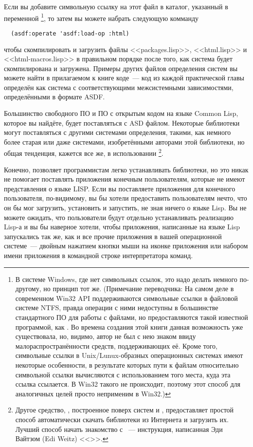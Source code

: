 Если вы добавите символьную ссылку на этот файл в каталог, указанный в переменной
\footnote{В системе Windows, где нет символьных ссылок, это
  надо делать немного по-другому, но принцип тот же. (Примечание переводчика: На самом
  деле в современном Win32 API поддерживаются символьные ссылки в файловой системе NTFS,
  правда операции с ними недоступны в большинстве стандартного ПО для работы с файлами, но
  предоставляются такой известной программой, как . Во времена создания этой
  книги данная возможность уже существовала, но, видимо, автор не был с нею знаком ввиду
  малораспространённости средств, поддерживающих её. Кроме того, символьные ссылки в
  Unix/Lunux-образных операционных системах имеют некоторые особенности, в результате
  которых пути к файлам относительно символьной ссылки вычисляются с использованием того
  места, куда эта ссылка ссылается. В Win32 такого не происходит, поэтому этот способ для
  аналогичных целей просто неприменим в Win32.) }, то затем вы можете набрать следующую
комманду

\begin{lstlisting}
  (asdf:operate 'asdf:load-op :html)
\end{lstlisting}

чтобы скомпилировать и загрузить файлы <<packages.lisp>>, <<html.lisp>> и
<<html-macros.lisp>> в правильном порядке после того, как система 
будет скомпилирована и загружена. Примеры других файлов определения систем  вы
можете найти в прилагаемом к книге коде~--- код из каждой практической главы определён как
система с соответствующими межсистемными зависимостями, определёнными в формате ASDF.

Большинство свободного ПО и ПО с открытым кодом на языке Common Lisp, которое вы найдёте,
будет поставляться с ASD файлом. Некоторые библиотеки могут поставляться с другими
системами определения, такими, как немного более старая  или даже
системами, изобретёнными авторами этой библиотеки, но общая тенденция, кажется все же, в
использовании \footnote{Другое средство, , построенное
  поверх систем  и , предоставляет простой способ
  автоматически скачать библиотеки из Интернета и загрузить их. Лучший способ начать
  знакомство с ~--- инструкция, написанная Эди Вайтзом (Edi Weitz)
  <<>>. }.

Конечно,  позволяет программистам легко устанавливать библиотеки, но это никак
не помогает поставлять приложения конечным пользователям, которые не имеют представления о
языке LISP. Если вы поставляете приложения для конечного пользователя, по-видимому, вы бы
хотели предоставить пользователям нечто, что он бы мог загрузить, установить и запустить,
не зная ничего о языке Lisp. Вы не можете ожидать, что пользователи будут отдельно
устанавливать реализацию Lisp-а и вы бы наверное хотели, чтобы приложения, написанные на
языке Lisp запускались так же, как и все прочие приложения в вашей операционной
системе~--- двойным нажатием кнопки мыши на иконке приложения или набором имени приложения
в командной строке интерпретатора команд.

